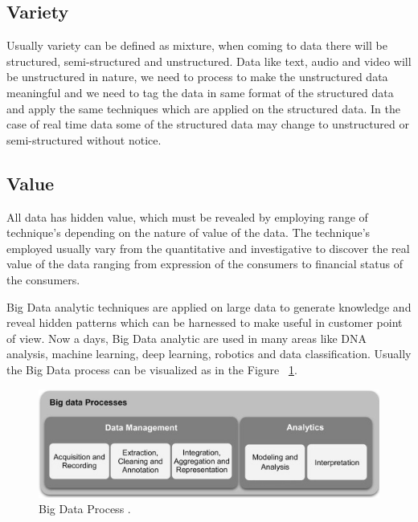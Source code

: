 \documentclass[sigconf]{acmart}
\begin{document}
\subsection{Variety}

Usually variety can be defined as mixture, when coming to data there will be structured, semi-structured and unstructured. Data like text, audio and video will be unstructured in nature, we need to process to make the unstructured data meaningful and we need to tag the data in same format of the structured data and apply the same techniques which are applied on the structured data. In the case of real time data some of the structured data may change to unstructured or semi-structured without notice.

\subsection{Value}

All data has hidden value, which must be revealed by employing range of technique's depending on the nature of value of the data. The technique's employed usually vary from the quantitative and investigative to discover the real value of the data ranging from expression of the consumers to financial status of the consumers.


Big Data analytic techniques are applied on large data to generate knowledge and reveal hidden patterns which can be harnessed to make useful in customer point of view. Now a days, Big Data analytic are used in many areas like DNA analysis, machine learning, deep learning, robotics and data classification. Usually the Big Data process can be visualized as in the Figure ~\ref{fig:BD}.


\begin{figure}[htb]
\centering
\includegraphics[width=1.0\columnwidth]{Capture1}
\caption{Big Data Process \cite{bigdata}.}
\label{fig:BD}
\end{figure}
\end{document}
